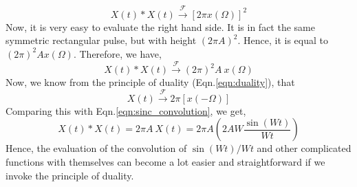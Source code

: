 	\[
	X(t)*X(t) \xrightarrow{\mathcal{F}} [2\pi x(\Omega)]^2
	\]
	Now, it is very easy to evaluate the right hand side. It is in fact the same symmetric rectangular pulse, but with height $(2\pi A)^2$. Hence, it is equal to $(2\pi)^2 A x(\Omega)$. Therefore, we have,
	\begin{equation}\label{eqn:sinc_convolution}
	X(t)*X(t) \xrightarrow{\mathcal{F}} (2\pi)^2 A \ x(\Omega)
	\end{equation}
	Now, we know from the principle of duality (Eqn.\ref{eqn:duality}), that
	\begin{equation}
		X(t) \xrightarrow{\mathcal{F}} 2\pi [x(-\Omega)]
	\end{equation}
	Comparing this with Eqn.\ref{eqn:sinc_convolution}, we get,
	\begin{equation}
		X(t)*X(t) = 2\pi A \ X(t) = 2\pi A \left( 2AW \frac{\sin(Wt)}{Wt} \right)
	\end{equation}
	Hence, the evaluation of the convolution of $\sin(Wt)/Wt$ and other complicated functions with themselves can become a lot easier and straightforward if we invoke the principle of duality.
